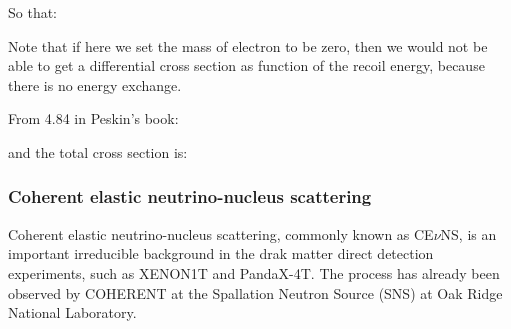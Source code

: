 
So that:


Note that if here we set the mass of electron to be zero,
then we would not be able to get a differential cross section as function of the recoil energy, because there is no energy exchange.


From 4.84 in Peskin's book:


and the total cross section is:


\subsubsection{Coherent elastic neutrino-nucleus scattering}

Coherent elastic neutrino-nucleus scattering, commonly known as CE$\nu$NS,
is an important irreducible background in the drak matter direct detection experiments,
such as XENON1T\cite{aprile_search_2021} and PandaX-4T\cite{ma_search_2023}.
The process has already been observed by COHERENT\cite{akimov_observation_2017} at the
Spallation Neutron Source (SNS) at Oak Ridge National Laboratory.

